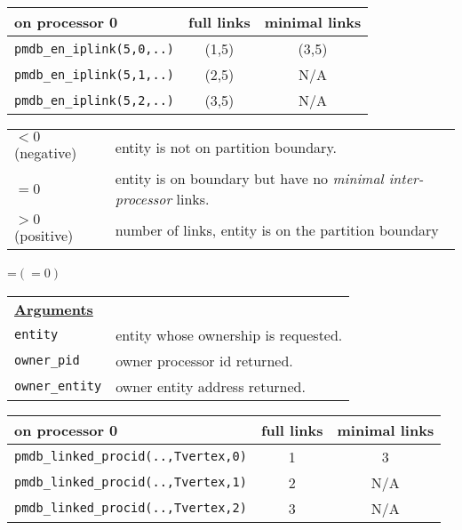 {\newpage
\clearpage
\samepage \begin{tabular}{|l|c|c|} \hline
on processor 0   & full links  & minimal links    \\  \hline \hline
{\tt pmdb\_en\_iplink(5,0,..)} &  (1,5)  & (3,5)    \\  \hline
{\tt pmdb\_en\_iplink(5,1,..)} &  (2,5)  & N/A   \\  \hline
{\tt pmdb\_en\_iplink(5,2,..)} &  (3,5)  & N/A   \\  \hline
\end{tabular}
}

{\newpage
\clearpage
\samepage \begin{tabular}{p{1.0in}p{4.9in}}
$< 0$ (negative) &  entity is not on partition boundary.  \\ 
$= 0$            &  entity is on boundary but have no 
                    {\it minimal inter-processor} links. \\ 
$> 0 $ (positive) & number of links, entity is on the partition boundary \\ 
\end{tabular}
}

{\newpage
\clearpage
\samepage \setbox\sizebox=\hbox{$(=0)$}\box\sizebox
}

{\newpage
\clearpage
\samepage \begin{tabular}{p{1.0in}p{4.9in}}
{\bf \underline{Arguments}} & \\  

\verb$entity$       &   entity whose ownership is requested. \\  
{\tt owner\_pid}    & owner processor id returned. \\  
{\tt owner\_entity} & owner entity address returned. \\  

\end{tabular}
}

{\newpage
\clearpage
\samepage \begin{tabular}{|l|c|c|} \hline
on processor 0      & full links  & minimal links  \\  \hline \hline
{\tt pmdb\_linked\_procid(..,Tvertex,0)} &  1  & 3     \\  \hline
{\tt pmdb\_linked\_procid(..,Tvertex,1)} &  2  & N/A   \\  \hline
{\tt pmdb\_linked\_procid(..,Tvertex,2)} &  3  & N/A   \\  \hline
\end{tabular}
}

